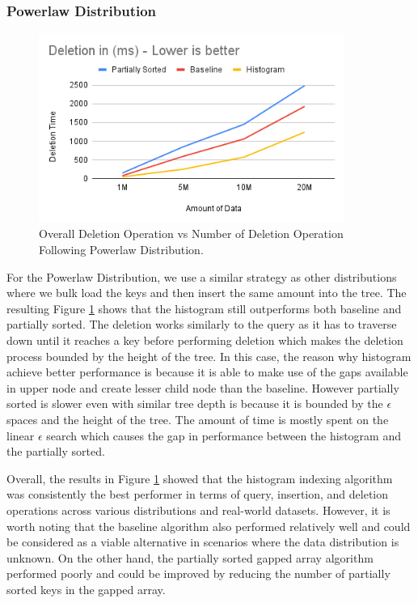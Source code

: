 \subsubsection{Powerlaw Distribution}
\begin{figure}[H]
    \centering
    \includegraphics[width=100mm,scale=1]{Figures/DeletePowerlaw.png}
    \caption{
Overall Deletion Operation vs Number of Deletion Operation Following Powerlaw Distribution.
    }
    \label{fig:DeletePowerlaw}
\end{figure}
For the Powerlaw Distribution, we use a similar strategy as other distributions where we bulk load the keys and then insert the same amount into the tree. The resulting Figure \ref{fig:DeletePowerlaw} shows that the histogram still outperforms both baseline and partially sorted. The deletion works similarly to the query as it has to traverse down until it reaches a key before performing deletion which makes the deletion process bounded by the height of the tree. In this case, the reason why histogram achieve better performance is because it is able to make use of the gaps available in upper node and create lesser child node than the baseline. However partially sorted is slower even with similar tree depth is because it is bounded by the $\epsilon$ spaces and the height of the tree. The amount of time is mostly spent on the linear $\epsilon$ search which causes the gap in performance between the histogram and the partially sorted. 


Overall, the results in Figure \ref{fig:DeletePowerlaw} showed that the histogram indexing algorithm was consistently the best performer in terms of query, insertion, and deletion operations across various distributions and real-world datasets. However, it is worth noting that the baseline algorithm also performed relatively well and could be considered as a viable alternative in scenarios where the data distribution is unknown. On the other hand, the partially sorted gapped array algorithm performed poorly and could be improved by reducing the number of partially sorted keys in the gapped array.


